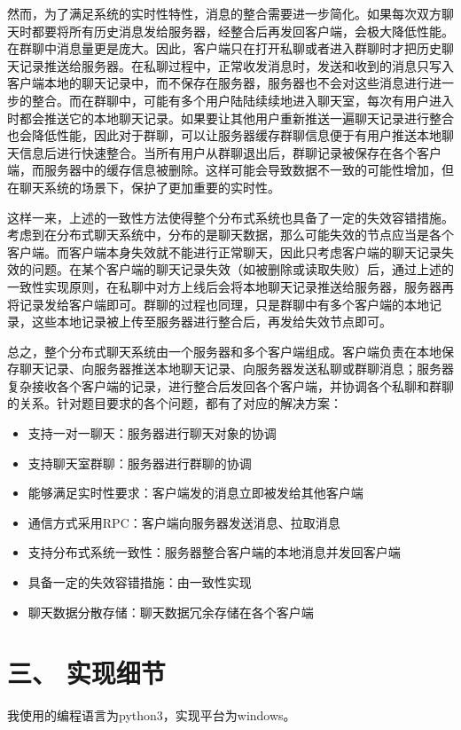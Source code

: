 \documentclass{report}
\begin{document}
然而，为了满足系统的实时性特性，消息的整合需要进一步简化。如果每次双方聊天时都要将所有历史消息发给服务器，经整合后再发回客户端，会极大降低性能。在群聊中消息量更是庞大。因此，客户端只在打开私聊或者进入群聊时才把历史聊天记录推送给服务器。在私聊过程中，正常收发消息时，发送和收到的消息只写入客户端本地的聊天记录中，而不保存在服务器，服务器也不会对这些消息进行进一步的整合。而在群聊中，可能有多个用户陆陆续续地进入聊天室，每次有用户进入时都会推送它的本地聊天记录。如果要让其他用户重新推送一遍聊天记录进行整合也会降低性能，因此对于群聊，可以让服务器缓存群聊信息便于有用户推送本地聊天信息后进行快速整合。当所有用户从群聊退出后，群聊记录被保存在各个客户端，而服务器中的缓存信息被删除。这样可能会导致数据不一致的可能性增加，但在聊天系统的场景下，保护了更加重要的实时性。

这样一来，上述的一致性方法使得整个分布式系统也具备了一定的失效容错措施。考虑到在分布式聊天系统中，分布的是聊天数据，那么可能失效的节点应当是各个客户端。而客户端本身失效就不能进行正常聊天，因此只考虑客户端的聊天记录失效的问题。在某个客户端的聊天记录失效（如被删除或读取失败）后，通过上述的一致性实现原则，在私聊中对方上线后会将本地聊天记录推送给服务器，服务器再将记录发给客户端即可。群聊的过程也同理，只是群聊中有多个客户端的本地记录，这些本地记录被上传至服务器进行整合后，再发给失效节点即可。

总之，整个分布式聊天系统由一个服务器和多个客户端组成。客户端负责在本地保存聊天记录、向服务器推送本地聊天记录、向服务器发送私聊或群聊消息；服务器复杂接收各个客户端的记录，进行整合后发回各个客户端，并协调各个私聊和群聊的关系。针对题目要求的各个问题，都有了对应的解决方案：

\begin{itemize}
\item 支持一对一聊天：服务器进行聊天对象的协调
\item 支持聊天室群聊：服务器进行群聊的协调
\item 能够满足实时性要求：客户端发的消息立即被发给其他客户端
\item 通信方式采用RPC：客户端向服务器发送消息、拉取消息
\item 支持分布式系统一致性：服务器整合客户端的本地消息并发回客户端
\item 具备一定的失效容错措施：由一致性实现
\item 聊天数据分散存储：聊天数据冗余存储在各个客户端
\end{itemize}

\section*{三、 实现细节}
我使用的编程语言为python3，实现平台为windows。
\end{document}
